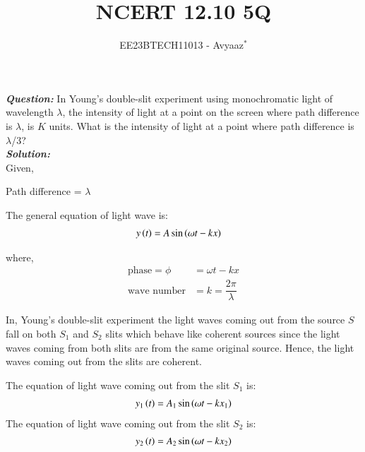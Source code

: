 \documentclass[journal,12pt,twocolumn]{IEEEtran}
\theoremstyle{remark}
\begin{document}

\vspace{3cm}

\title{NCERT 12.10 5Q}
\author{EE23BTECH11013 - Avyaaz$^{*}$%
}
\maketitle
\newpage
\bigskip

\renewcommand{\thefigure}{\theenumi}
\renewcommand{\thetable}{\arabic{table}}

\large\textbf{\textsl{Question:}}
In Young’s double-slit experiment using monochromatic light of wavelength $\lambda$, the intensity of light at a point on the screen where path difference is $\lambda$, is $K$ units. What is the intensity of light at a
point where path difference is $\lambda$/3?\\
\large\textbf{\textsl{Solution:}}\\
Given,\\
\begin{table}[htbp]
\centering

\vspace{0.2cm}
\caption{$Parameters$}
\label{tab:parameters}
\end{table}

\hspace*{1cm}Path difference = $\lambda$

The general equation of light wave is:
\begin{align}
       y\left(t\right) &= A\sin{(\omega t - kx)} \label{eq:lightwave}
\end{align}

 where,
 \begin{align}
 \text{phase} = \phi &= \omega t - kx \nonumber \\
 \text{wave number} &= k = \dfrac{2\pi}{\lambda} \nonumber 
 \end{align}

In, Young's double-slit experiment the light waves coming out from the source $S$ fall on both $S_1$ and $S_2$ slits which behave like coherent sources since the light waves coming from both slits are from the same original source. Hence, the light waves coming out from the slits are coherent.

\vspace{0.3cm}

The equation of light wave coming out from the slit $S_1$ is:
\begin{align}
    y_1\left(t\right) = A_1\sin{(\omega t - kx_1)} 
\end{align}
The equation of light wave coming out from the slit $S_2$ is:
\begin{align}
     y_2\left(t\right) = A_2\sin{(\omega t - kx_2)}
\end{align}
\end{document}
